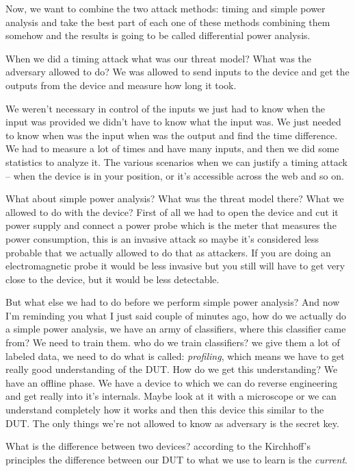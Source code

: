 Now, we want to combine the two attack methods: timing and simple power analysis
and take the best part of each one of these methods combining them somehow and
the results is going to be called differential power analysis.
 
When we did a timing attack what was our threat model? What was the adversary
allowed to do? We was allowed to send inputs to the device and get the outputs
from the device and measure how long it took.
 
We weren't necessary in control of the inputs we just had to know when the input
was provided we didn't have to know what the input was. We just needed to know
when was the input when was the output and find the time difference. We had to
measure a lot of times and have many inputs, and then we did some statistics to
analyze it. The various scenarios when we can justify a timing attack – when the
device is in your position, or it's accessible across the web and so on.

What about simple power analysis? What was the threat model there? What we
allowed to do with the device? First of all we had to open the device and cut it
power supply and connect a power probe which is the meter that measures the
power consumption, this is an invasive attack so maybe it's considered less
probable that we actually allowed to do that as attackers. If you are doing an
electromagnetic probe it would be less invasive but you still will have to get
very close to the device, but it would be less detectable. 

But what else we had to do before we perform simple power analysis? And now I'm
reminding you what I just said couple of minutes ago, how do we actually do a
simple power analysis, we have an army of classifiers, where this classifier
came from? We need to train them. who do we train classifiers? we give them a
lot of labeled data, we need to do what is called: \textit{profiling}, which
means we have to get really good understanding of the DUT. How do we get this
understanding? We have an offline phase. We have a device to which we can do
reverse engineering and get really into it's internals. Maybe look at it with a
microscope or we can understand completely how it works and then this device
this similar to the DUT. The only things we're not allowed to know as adversary
is the secret key.

What is the difference between two devices? according to the Kirchhoff's
principles the difference between our DUT to what we use to learn is the
\textit{current}. 
  
